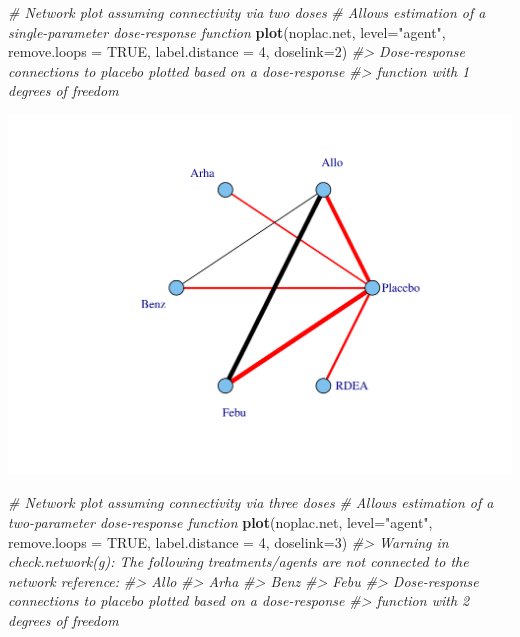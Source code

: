 \documentclass[]{article}
\newenvironment{Shaded}{\begin{snugshade}}{\end{snugshade}}
\newcommand{\CommentTok}[1]{\textcolor[rgb]{0.56,0.35,0.01}{\textit{#1}}}
\newcommand{\DataTypeTok}[1]{\textcolor[rgb]{0.13,0.29,0.53}{#1}}
\newcommand{\DecValTok}[1]{\textcolor[rgb]{0.00,0.00,0.81}{#1}}
\newcommand{\KeywordTok}[1]{\textcolor[rgb]{0.13,0.29,0.53}{\textbf{#1}}}
\newcommand{\NormalTok}[1]{#1}
\newcommand{\OtherTok}[1]{\textcolor[rgb]{0.56,0.35,0.01}{#1}}
\newcommand{\StringTok}[1]{\textcolor[rgb]{0.31,0.60,0.02}{#1}}
\begin{document}
\begin{Shaded}
\begin{Highlighting}[]
\CommentTok{# Network plot assuming connectivity via two doses}
\CommentTok{# Allows estimation of a single-parameter dose-response function}
\KeywordTok{plot}\NormalTok{(noplac.net, }\DataTypeTok{level=}\StringTok{"agent"}\NormalTok{, }\DataTypeTok{remove.loops =} \OtherTok{TRUE}\NormalTok{, }\DataTypeTok{label.distance =} \DecValTok{4}\NormalTok{,}
     \DataTypeTok{doselink=}\DecValTok{2}\NormalTok{)}
\CommentTok{#> Dose-response connections to placebo plotted based on a dose-response}
\CommentTok{#>                    function with 1 degrees of freedom}
\end{Highlighting}
\end{Shaded}

\includegraphics{mbnmadose_files/figure-latex/unnamed-chunk-30-1.pdf}

\begin{Shaded}
\begin{Highlighting}[]

\CommentTok{# Network plot assuming connectivity via three doses}
\CommentTok{# Allows estimation of a two-parameter dose-response function}
\KeywordTok{plot}\NormalTok{(noplac.net, }\DataTypeTok{level=}\StringTok{"agent"}\NormalTok{, }\DataTypeTok{remove.loops =} \OtherTok{TRUE}\NormalTok{, }\DataTypeTok{label.distance =} \DecValTok{4}\NormalTok{,}
     \DataTypeTok{doselink=}\DecValTok{3}\NormalTok{)}
\CommentTok{#> Warning in check.network(g): The following treatments/agents are not connected to the network reference:}
\CommentTok{#> Allo}
\CommentTok{#> Arha}
\CommentTok{#> Benz}
\CommentTok{#> Febu}
\CommentTok{#> Dose-response connections to placebo plotted based on a dose-response}
\CommentTok{#>                    function with 2 degrees of freedom}
\end{Highlighting}
\end{Shaded}
\end{document}
